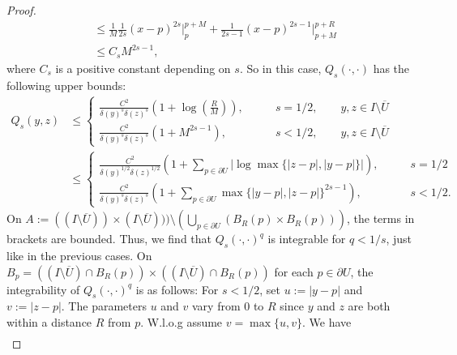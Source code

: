 \documentclass[preprint,12pt]{elsarticle}
\begin{document}
\begin{proof}
\begin{align}
        &\leq \frac{1}{M}\frac{1}{2s}(x-p)^{2s}\Big|_p^{p+M}+\frac{1}{2s-1}(x-p)^{2s-1}\Big|_{p+M}^{p+R}\nonumber\\
        &\leq C_sM^{2s-1},
    \end{align}
    where $C_s$ is a positive constant depending on $s$. So in this case, $Q_s(\cdot,\cdot)$ has the following upper bounds:
    \begin{align}\label{case4_Qbound_s<=1/2}
       Q_s(y,z)&\leq\begin{cases}
           \frac{C^2}{\delta(y)^s\delta(z)^s}\left(1+\log\left(\frac{R}{M}\right)\right), \qquad &s=1/2,\qquad y,z\in I\setminus\overline{U}\nonumber\\
           \frac{C^2}{\delta(y)^s\delta(z)^s}\left(1+M^{2s-1}\right), \qquad &s<1/2, \qquad y,z\in I\setminus\overline{U}
       \end{cases}\\
       &\leq\begin{cases}
            \frac{C^2}{\delta(y)^{1/2}\delta(z)^{1/2}}\left(1+\sum_{p\in\partial U}\left|\log\max\{|z-p|,|y-p|\}\right|\right), \qquad &s=1/2\\
            \frac{C^2}{\delta(y)^s\delta(z)^s}\left(1+\sum_{p\in\partial U}\max\{|y-p|,|z-p|\}^{2s-1}\right),\qquad &s<1/2.
        \end{cases}
    \end{align}
    On $A:=((I\setminus\overline{U}))\times (I\setminus\overline{U})))\setminus\left(\bigcup_{p\in\partial U}(B_R(p)\times B_R(p))\right)$, the terms in brackets are bounded.  Thus, we find that $Q_s(\cdot,\cdot)^q$ is integrable for $q<1/s$, just like in the previous cases.
    On $B_p=\left((I\setminus\overline{U})\cap B_R(p)\right)\times\left((I\setminus\overline{U})\cap B_R(p)\right)$ for each $p\in\partial U$, the integrability of $Q_s(\cdot,\cdot)^q$ is as follows: For $s<1/2$, set $u:=|y-p|$ and $v:=|z-p|$. The parameters $u$ and $v$ vary from $0$ to $R$ since $y$ and $z$ are both within a distance $R$ from $p$. W.l.o.g assume $v=\max\{u,v\}$. We have
    \begin{align}

\end{align}
\end{proof}
\end{document}
